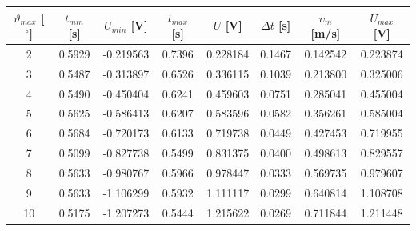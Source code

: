 \documentclass[a4paper,11pt]{article}
\begin{document}
                \begin{table}[t]   
                    \centering
                    \begin{tabular}{|c|c|c|c|c|c|c|c|}
                        \hline
                        $\vartheta_{max}$ [$^\circ$] & $t_{min}$ [s] & $U_{min}$ [V] & $t_{max}$ [s] & $U$ [V] & $\Delta t$ [s] & $\upsilon_m$ [m/s] & $U_{max}$ [V] \\ 
                        \hline
                        2 & 0.5929 & -0.219563 & 0.7396 & 0.228184 & 0.1467 & 0.142542 & 0.223874 \\
                        \hline
                        3 & 0.5487 & -0.313897 & 0.6526 & 0.336115 & 0.1039 & 0.213800 & 0.325006 \\
                        \hline
                        4 & 0.5490 & -0.450404 & 0.6241 & 0.459603 & 0.0751 & 0.285041 & 0.455004 \\
                        \hline
                        5 & 0.5625 & -0.586413 & 0.6207 & 0.583596 & 0.0582 & 0.356261 & 0.585004 \\
                        \hline
                        6 & 0.5684 & -0.720173 & 0.6133 & 0.719738 & 0.0449 & 0.427453 & 0.719955 \\
                        \hline
                        7 & 0.5099 & -0.827738 & 0.5499 & 0.831375 & 0.0400 & 0.498613 & 0.829557 \\
                        \hline
                        8 & 0.5633 & -0.980767 & 0.5966 & 0.978447 & 0.0333 & 0.569735 & 0.979607 \\
                        \hline
                        9 & 0.5633 & -1.106299 & 0.5932 & 1.111117 & 0.0299 & 0.640814 & 1.108708 \\
                        \hline
                        10 & 0.5175 & -1.207273 & 0.5444 & 1.215622 & 0.0269 & 0.711844 & 1.211448 \\
                        \hline
                    \end{tabular}
                    \captionsetup{justification=centering, font=footnotesize}
                \end{table}
\end{document}
